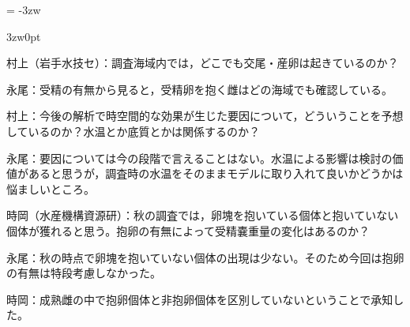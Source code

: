 \parindent = -3zw
\begin{indentation}{3zw}{0pt}

	村上（岩手水技セ）：調査海域内では，どこでも交尾・産卵は起きているのか？

	永尾：受精の有無から見ると，受精卵を抱く雌はどの海域でも確認している。
	
	村上：今後の解析で時空間的な効果が生じた要因について，どういうことを予想しているのか？水温とか底質とかは関係するのか？

	永尾：要因については今の段階で言えることはない。水温による影響は検討の価値があると思うが，調査時の水温をそのままモデルに取り入れて良いかどうかは悩ましいところ。

	時岡（水産機構資源研）：秋の調査では，卵塊を抱いている個体と抱いていない個体が獲れると思う。抱卵の有無によって受精嚢重量の変化はあるのか？
	
	永尾：秋の時点で卵塊を抱いていない個体の出現は少ない。そのため今回は抱卵の有無は特段考慮しなかった。
	
	時岡：成熟雌の中で抱卵個体と非抱卵個体を区別していないということで承知した。

\end{indentation}
